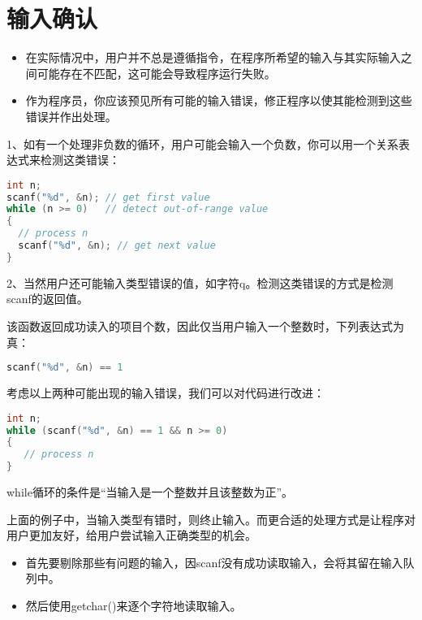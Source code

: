 \section{输入确认}
\begin{frame}[fragile]\ft{\secname}
\begin{itemize}
\item
在实际情况中，用户并不总是遵循指令，在程序所希望的输入与其实际输入之间可能存在不匹配，这可能会导致程序运行失败。\\[0.1in]
\item
作为程序员，你应该预见所有可能的输入错误，修正程序以使其能检测到这些错误并作出处理。

\end{itemize}
\end{frame}

\begin{frame}[fragile]\ft{\secname}
1、如有一个处理非负数的循环，用户可能会输入一个负数，你可以用一个关系表达式来检测这类错误：
\begin{lstlisting}[language=c]
int n;
scanf("%d", &n); // get first value
while (n >= 0)   // detect out-of-range value
{
  // process n
  scanf("%d", &n); // get next value
}
\end{lstlisting}
\end{frame}

\begin{frame}[fragile]\ft{\secname}
2、当然用户还可能输入类型错误的值，如字符q。检测这类错误的方式是检测scanf的返回值。 \vspace{0.1in}

该函数返回成功读入的项目个数，因此仅当用户输入一个整数时，下列表达式为真：
\begin{lstlisting}[language=c]
scanf("%d", &n) == 1
\end{lstlisting}
\end{frame}

\begin{frame}[fragile]\ft{\secname}
考虑以上两种可能出现的输入错误，我们可以对代码进行改进：
\begin{lstlisting}[language=c]
int n;
while (scanf("%d", &n) == 1 && n >= 0) 
{
   // process n 
}
\end{lstlisting}
{\tf while}循环的条件是“当输入是一个整数并且该整数为正”。
\end{frame}

\begin{frame}[fragile]\ft{\secname}
上面的例子中，当输入类型有错时，则终止输入。而更合适的处理方式是让程序对用户更加友好，给用户尝试输入正确类型的机会。\vspace{.1in}

\begin{itemize}
\item 首先要剔除那些有问题的输入，因scanf没有成功读取输入，会将其留在输入队列中。\\[0.1in]
\item 然后使用{\tf getchar()}来逐个字符地读取输入。
\end{itemize}

\end{frame}

